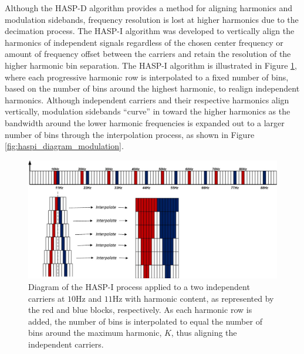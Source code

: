 Although the HASP-D algorithm provides a method for aligning harmonics and modulation sidebands, frequency resolution is lost at higher harmonics due to the decimation process.  The HASP-I algorithm was developed to vertically align the harmonics of independent signals regardless of the chosen center frequency or amount of frequency offset between the carriers and retain the resolution of the higher harmonic bin separation.  The HASP-I algorithm is illustrated in Figure \ref{fig:haspi_diagram_independent}, where each progressive harmonic row is interpolated to a fixed number of bins, based on the number of bins around the highest harmonic, to realign independent harmonics.  Although independent carriers and their respective harmonics align vertically, modulation sidebands ``curve'' in toward the higher harmonics as the bandwidth around the lower harmonic frequencies is expanded out to a larger number of bins through the interpolation process, as shown in Figure \ref{fig:haspi_diagram_modulation}.

\begin{figure}[tp]
	\includegraphics[width=\textwidth]{./misc_graphics/haspi_diagram_independent.jpg}
	\centering
	\caption{Diagram of the HASP-I process applied to a two independent carriers at $10$Hz and $11$Hz with harmonic content, as represented by the red and blue blocks, respectively.  As each harmonic row is added, the number of bins is interpolated to equal the number of bins around the maximum harmonic, $K$, thus aligning the independent carriers.}
	\label{fig:haspi_diagram_independent}
\end{figure}

